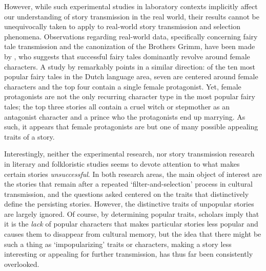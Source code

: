 However, while such experimental studies in laboratory contexts implicitly affect our understanding of story transmission in the real world, their results cannot be unequivocally taken to apply to real-world story transmission and selection phenomena. Observations regarding real-world data, specifically concerning fairy tale transmission and the canonization of the Brothers Grimm, have been made by \citeauthor{joosen:2014}, who suggests that successful fairy tales dominantly revolve around female characters. A study by \citeauthor{koman:2008} remarkably points in a similar direction: of the ten most popular fairy tales in the Dutch language area, seven are centered around female characters and the top four contain a single female protagonist.\autocite[I.e.\ ``Snow White'', ``Cinderella'', ``Sleeping Beauty'', and ``Red Riding Hood'', cf.][]{koman:2008} Yet, female protagonists are not the only recurring character type in the most popular fairy tales; the top three stories all contain a cruel witch or stepmother as an antagonist character and a prince who the protagonists end up marrying. As such, it appears that female protagonists are but one of many possible appealing traits of a story. 

Interestingly, neither the experimental research, nor story transmission research in literary and folkloristic studies seems to devote attention to what makes certain stories \emph{unsuccessful}. In both research areas, the main object of interest are the stories that remain after a repeated `filter-and-selection' process in cultural transmission, and the questions asked centered on the traits that distinctively define the persisting stories. However, the distinctive traits of unpopular stories are largely ignored. Of course, by determining popular traits, scholars imply that it is the \emph{lack} of popular characters that makes particular stories less popular and causes them to disappear from cultural memory, but the idea that there might be such a thing as `impopularizing' traits or characters, making a story less interesting or appealing for further transmission, has thus far been consistently overlooked.

